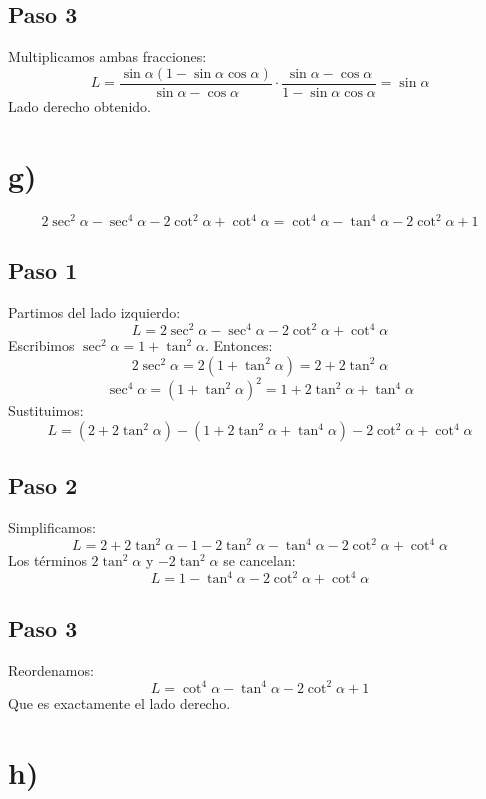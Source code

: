 \documentclass[12pt,a4paper]{article}
\begin{document}
\subsection*{Paso 3}
Multiplicamos ambas fracciones:
\[
L = \frac{\sin\alpha(1-\sin\alpha\cos\alpha)}{\sin\alpha-\cos\alpha}
\cdot
\frac{\sin\alpha-\cos\alpha}{1-\sin\alpha\cos\alpha}
= \sin\alpha
\]
Lado derecho obtenido.

\newpage
\section*{g)}

\begin{identidad}
\[
2\sec^2\alpha-\sec^4\alpha-2\cot^2\alpha+\cot^4\alpha
=
\cot^4\alpha-\tan^4\alpha-2\cot^2\alpha+1
\]
\end{identidad}

\subsection*{Paso 1}
Partimos del lado izquierdo:
\[
L = 2\sec^2\alpha - \sec^4\alpha - 2\cot^2\alpha + \cot^4\alpha
\]
Escribimos \(\sec^2\alpha = 1+\tan^2\alpha\). Entonces:
\[
2\sec^2\alpha = 2(1+\tan^2\alpha) = 2+2\tan^2\alpha
\]
\[
\sec^4\alpha = (1+\tan^2\alpha)^2 = 1 + 2\tan^2\alpha + \tan^4\alpha
\]
Sustituimos:
\[
L = (2+2\tan^2\alpha) - (1+2\tan^2\alpha+\tan^4\alpha) - 2\cot^2\alpha + \cot^4\alpha
\]

\subsection*{Paso 2}
Simplificamos:
\[
L = 2+2\tan^2\alpha -1 -2\tan^2\alpha - \tan^4\alpha - 2\cot^2\alpha + \cot^4\alpha
\]
Los términos \(2\tan^2\alpha\) y \(-2\tan^2\alpha\) se cancelan:
\[
L = 1 - \tan^4\alpha - 2\cot^2\alpha + \cot^4\alpha
\]

\subsection*{Paso 3}
Reordenamos:
\[
L = \cot^4\alpha - \tan^4\alpha - 2\cot^2\alpha + 1
\]
Que es exactamente el lado derecho.

\newpage
\section*{h)}
\end{document}

